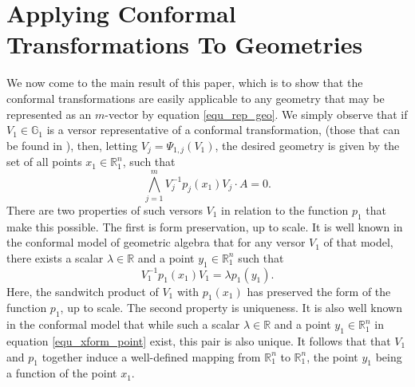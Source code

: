 \documentclass{ecgd-l}
\theoremstyle{definition}
\theoremstyle{remark}
\numberwithin{equation}{section}
\newcommand{\G}{\mathbb{G}}
\newcommand{\R}{\mathbb{R}}
\begin{document}
\section{Applying Conformal Transformations To Geometries}\label{sec_apply_conf_xforms}

We now come to the main result of this paper, which is to show
that the conformal transformations are easily applicable to any geometry
that may be represented as an $m$-vector by equation \eqref{equ_rep_geo}.
We simply observe that if $V_1\in\G_1$ is a versor representative
of a conformal transformation, (those that can be found in \cite{Dorst07,LiRockwood01}),
then, letting $V_j=\Psi_{1,j}(V_1)$, the desired
geometry is given by the set of all points $x_1\in\R^n_1$, such that
\begin{equation}\label{equ_xform_intuition}
\bigwedge_{j=1}^m V_j^{-1} p_j(x_1) V_j\cdot A=0.
\end{equation}
There are two properties of such versors $V_1$ in relation to the function $p_1$
that make this possible.  The first is form preservation, up to scale.  It is well known in the conformal
model of geometric algebra that for any versor $V_1$ of that model, there exists a scalar $\lambda\in\R$
and a point $y_1\in\R_1^n$ such that
\begin{equation}\label{equ_xform_point}
V_1^{-1}p_1(x_1)V_1 = \lambda p_1(y_1).
\end{equation}
Here, the sandwitch product of $V_1$ with $p_1(x_1)$ has preserved the form of the
function $p_1$, up to scale.  The second property is uniqueness.
It is also well known in the conformal model that while such a scalar $\lambda\in\R$ and a
point $y_1\in\R_1^n$ in equation \eqref{equ_xform_point} exist, this pair is also unique.  It follows that
that $V_1$ and $p_1$ together induce a well-defined mapping from $\R_1^n$ to $\R_1^n$,
the point $y_1$ being a function of the point $x_1$.
\end{document}
